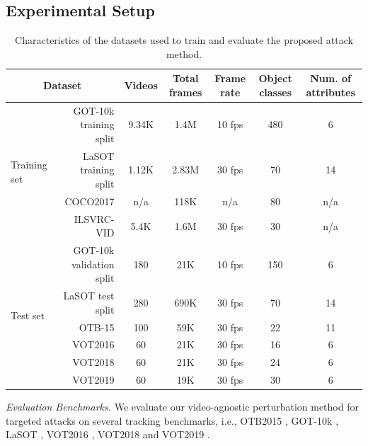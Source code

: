 \documentclass[journal]{IEEEtran}
\newcommand{\ie}{i.e.}
\begin{document}
\subsection{Experimental Setup}\label{setup}
\begin{table}[t]
  \centering
  \caption{Characteristics of the datasets used to train and evaluate the proposed attack method.}
  \begin{tabular}{lrccccc} \toprule
  \multicolumn{2}{c}{Dataset}                            & Videos & Total frames & Frame rate & Object classes & Num. of attributes \\ \midrule
  \multirow{4}{*}{Training set} & GOT-10k training split & 9.34K  & 1.4M        & 10 fps     & 480            & 6                  \\
                                & LaSOT training split   & 1.12K  & 2.83M        & 30 fps     & 70             & 14                 \\
                                & COCO2017               & n/a    & 118K         & n/a        & 80             & n/a                \\
                                & ILSVRC-VID             & 5.4K   & 1.6M         & 30 fps     & 30             & n/a                \\ \midrule
  \multirow{7}{*}{Test set}     & GOT-10k validation split& 180   & 21K          & 10 fps     & 150            & 6                  \\
                                & LaSOT test split       & 280    & 690K         & 30 fps     & 70             & 14                 \\
                                & OTB-15                 & 100    & 59K          & 30 fps     & 22             & 11                 \\
                                & VOT2016                & 60     & 21K          & 30 fps     & 16             & 6                  \\
                                & VOT2018                & 60     & 21K          & 30 fps     & 24             & 6                  \\ 
                                & VOT2019                & 60     & 19K          & 30 fps     & 30             & 6                  \\ \bottomrule
  \end{tabular}
  \vspace{-4mm}
  \label{tab:dataset}
\end{table}
\textit{Evaluation Benchmarks.} We evaluate our video-agnostic perturbation method for targeted attacks on several tracking benchmarks, \ie, OTB2015 \cite{OTB}, GOT-10k \cite{GOT-10k}, LaSOT \cite{LaSOT}, VOT2016 \cite{VOT2016}, VOT2018 \cite{VOT2018} and VOT2019 \cite{VOT2019}.
\end{document}
